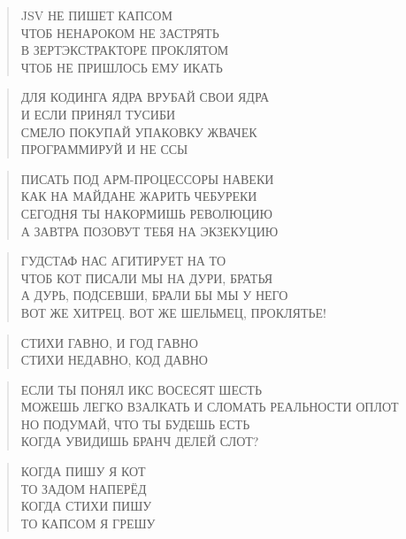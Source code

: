 \poemtitle{***}
\begin{verse}
JSV НЕ ПИШЕТ КАПСОМ\\
ЧТОБ НЕНАРОКОМ НЕ ЗАСТРЯТЬ\\
В ЗЕРТЭКСТРАКТОРЕ ПРОКЛЯТОМ\\
ЧТОБ НЕ ПРИШЛОСЬ ЕМУ ИКАТЬ
\end{verse}

\poemtitle{***}
\begin{verse}
ДЛЯ КОДИНГА ЯДРА ВРУБАЙ СВОИ ЯДРА\\
И ЕСЛИ ПРИНЯЛ ТУСИБИ\\
СМЕЛО ПОКУПАЙ УПАКОВКУ ЖВАЧЕК\\
ПРОГРАММИРУЙ И НЕ ССЫ
\end{verse}

\poemtitle{***}
\begin{verse}
ПИСАТЬ ПОД АРМ-ПРОЦЕССОРЫ НАВЕКИ\\
КАК НА МАЙДАНЕ ЖАРИТЬ ЧЕБУРЕКИ\\
СЕГОДНЯ ТЫ НАКОРМИШЬ РЕВОЛЮЦИЮ\\
А ЗАВТРА ПОЗОВУТ ТЕБЯ  НА ЭКЗЕКУЦИЮ
\end{verse}

\poemtitle{***}
\begin{verse}
ГУДСТАФ НАС АГИТИРУЕТ НА ТО\\
ЧТОБ КОТ ПИСАЛИ МЫ НА ДУРИ, БРАТЬЯ\\
А ДУРЬ, ПОДСЕВШИ, БРАЛИ БЫ МЫ У НЕГО\\
ВОТ ЖЕ ХИТРЕЦ. ВОТ ЖЕ ШЕЛЬМЕЦ, ПРОКЛЯТЬЕ!
\end{verse}

\poemtitle{***}
\begin{verse}
СТИХИ ГАВНО, И ГОД ГАВНО\\
СТИХИ НЕДАВНО, КОД ДАВНО
\end{verse}

\poemtitle{***}
\begin{verse}
ЕСЛИ ТЫ ПОНЯЛ ИКС ВОСЕСЯТ ШЕСТЬ\\
МОЖЕШЬ ЛЕГКО ВЗАЛКАТЬ И СЛОМАТЬ РЕАЛЬНОСТИ ОПЛОТ\\
НО ПОДУМАЙ, ЧТО ТЫ БУДЕШЬ ЕСТЬ\\
КОГДА УВИДИШЬ БРАНЧ ДЕЛЕЙ СЛОТ?
\end{verse}

\poemtitle{***}
\begin{verse}
КОГДА ПИШУ Я КОТ\\
ТО ЗАДОМ НАПЕРЁД\\
КОГДА СТИХИ ПИШУ\\
ТО КАПСОМ Я ГРЕШУ
\end{verse}

